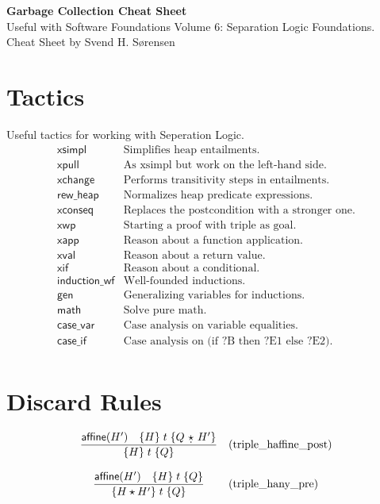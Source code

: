 \documentclass[10pt,a4paper]{article}
\newcommand{\qstar}{\text{ \d{$\star$} }} %
\newcommand{\haffine}[1]{\mathsf{affine}(#1)}
\newcommand{\triple}[3]{\{#2\}\;#1\;\{#3\}}
\begin{document}
\pagestyle{empty}
\begin{center}
  {\LARGE \textbf{Garbage Collection Cheat Sheet}}\\[1ex]
  {\small Useful with Software Foundations Volume 6: Separation Logic Foundations. Cheat Sheet by Svend H. Sørensen}
\end{center}

\begin{multicols}{2}

\section*{Tactics}
Useful tactics for working with Seperation Logic.
\[
\begin{array}{ll}
  \mathsf{xsimpl} &  \text{Simplifies heap entailments.} \\
  \mathsf{xpull} & \text{As xsimpl but work on the left-hand side.} \\
  \mathsf{xchange} & \text{Performs transitivity steps in entailments.} \\
  \mathsf{rew\_heap} & \text{Normalizes heap predicate expressions.} \\
  \mathsf{xconseq} & \text{Replaces the postcondition with a stronger one.} \\
  \mathsf{xwp} & \text{Starting a proof with triple as goal.} \\
  \mathsf{xapp} & \text{Reason about a function application.} \\
  \mathsf{xval} & \text{Reason about a return value.} \\
  \mathsf{xif} & \text{Reason about a conditional.} \\
  \mathsf{induction\_wf} & \text{Well-founded inductions.} \\
   \mathsf{gen} & \text{Generalizing variables for inductions.} \\
  \mathsf{math} & \text{Solve pure math.} \\
  \mathsf{case\_var} & \text{Case analysis on variable equalities.} \\
  \mathsf{case\_if} & \text{Case analysis on (if ?B then ?E1 else ?E2).} \\
\end{array}
\]

\section*{Discard Rules}
\[
  \begin{array}{cl}
  \dfrac{\haffine{H'} \quad \triple{t}{H}{Q \qstar H'}}
  {\triple{t}{H}{Q}} & \text{(triple\_haffine\_post)} \\
 \\
  \dfrac{\haffine{H'} \quad \triple{t}{H}{Q}}
  {\triple{t}{H \star H'}{Q}} & \text{(triple\_hany\_pre)} \\
  \\
  \end{array}
\]


\end{multicols}
\end{document}
